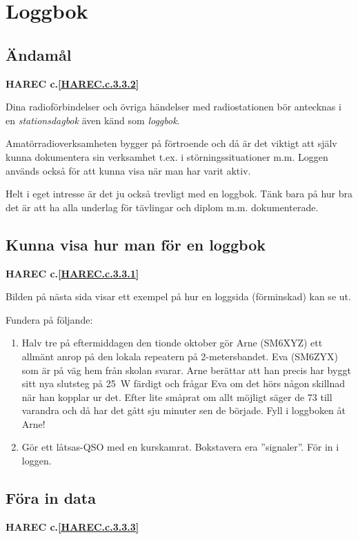 \section{Loggbok}

\subsection{Ändamål}
\textbf{HAREC
  c.\ref{HAREC.c.3.3.2}\label{myHAREC.c.3.3.2}
}

Dina radioförbindelser och övriga händelser med radiostationen bör
antecknas i en \emph{stationsdagbok} även känd som \emph{loggbok}.

Amatörradioverksamheten bygger på förtroende och då är det viktigt att
själv kunna dokumentera sin verksamhet t.ex. i störningssituationer
m.m. Loggen används också för att kunna visa när man har varit aktiv.

Helt i eget intresse är det ju också trevligt med en loggbok. Tänk
bara på hur bra det är att ha alla underlag för tävlingar och diplom
m.m. dokumenterade.

\subsection{Kunna visa hur man för en loggbok}
\textbf{HAREC
  c.\ref{HAREC.c.3.3.1}\label{myHAREC.c.3.3.1}
}

Bilden på nästa sida visar ett exempel på hur en loggsida (förminskad)
kan se ut.

Fundera på följande:
\begin{enumerate}
\item Halv tre på eftermiddagen den tionde oktober gör Arne (SM6XYZ)
  ett allmänt anrop på den lokala repeatern på 2-metersbandet.
  Eva (SM6ZYX) som är på väg hem från skolan svarar.
  Arne berättar att han precis har byggt sitt nya slutsteg på 25~W
  färdigt och frågar Eva om det hörs någon skillnad när han kopplar ur det.
  Efter lite småprat om allt möjligt säger de 73 till varandra och då har det
  gått sju minuter sen de började.  Fyll i loggboken åt Arne!
\item Gör ett låtsas-QSO med en kurskamrat.
  Bokstavera era ''signaler''.
  För in i loggen.
\end{enumerate}

\subsection{Föra in data}
\textbf{HAREC
  c.\ref{HAREC.c.3.3.3}\label{myHAREC.c.3.3.3}
}

